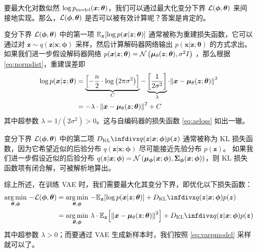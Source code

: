 要最大化对数似然 $\log p_{\mathrm {model}}(\bm x; \bm\theta)$，我们可以通过最大化变分下界 $\mathcal{L}(\bm \phi, \bm \theta)$ 来间接地实现。那么，$\mathcal{L}(\bm \phi, \bm \theta)$ 是否可以被有效计算呢？答案是肯定的。

变分下界 $\mathcal{L}(\bm \phi, \bm \theta)$ 中的第一项 $\mathbb{E}_{\bm z} {\left[\log p(\bm x | \bm z; \bm\theta)\right]}$ 通常被称为重建损失函数，它可以通过对 $\bm z \sim q(\bm z | \bm x; \bm\phi)$ 采样，然后计算解码器网络输出 $p(\bm x | \bm z; \bm\theta)$ 的方式求出。如果我们进一步假设解码器网络 $p(\bm x | \bm z; \bm\theta) = \mathcal{N}\left(\bm \mu_\theta(\bm z; \bm \theta), \sigma^2 I\right)$ %
，那么根据 \eqref{eq:normdist}，重建误差即
\begin{align}
	{%
		{%
				\log p(\bm x | \bm z; \bm\theta)%
			}}
	 & =
	\underbrace{\left[ - \frac{n}{2} \cdot \log\left(2\pi\sigma^2\right) \right]}_{C}
	-
	\underbrace{\left[ \frac{1}{2\sigma^2} \right]}_{\lambda} \cdot \Norm*{\bm x - \bm \mu_\theta(\bm z; \bm \theta)}^2 \notag \\
	 & = - \lambda \cdot\Norm*{\bm x - \bm \mu_\theta(\bm z; \bm \theta)}^2 + C
	\label{eq:vaerecons}
\end{align}
其中超参数 $\lambda = 1/\left(2\sigma^2\right)> 0$。这与自编码器的损失函数 \eqref{eq:aeloss} 如出一辙。

变分下界 $\mathcal{L}(\bm \phi, \bm \theta)$ 中的第二项 $\DKL{q(\bm z | \bm x; \bm\phi)}{p(\bm z)}$ 通常被称为 KL 损失函数，因为它希望近似的后验分布 $q(\bm z | \bm x; \bm\phi)$ 尽可能接近先验分布 $p(\bm z)$。
如果我们进一步假设近似的后验分布
$q(\bm z | \bm x; \bm\phi) = \mathcal{N}
	\left(
	\bm\mu_{\bm\phi}   (\bm x; \bm\phi),
	\bm\Sigma_{\bm\phi}(\bm x; \bm\phi)
	\right)$，则 KL 损失函数项有闭合解，可被解析地算出。

综上所述，在训练 VAE 时，我们需要最大化其变分下界，即优化以下损失函数：
\begin{align}
	\argmin{\bm\theta, \bm\phi}
	- \Loss(\bm \phi, \bm \theta) & =
	\argmin{\bm\theta, \bm\phi}
	- {\EXPECT{\bm z} {\left[\log p(\bm x | \bm z; \bm\theta)\right]}}
	+ \DKL{q(\bm z | \bm x; \bm\phi)}{p(\bm z)}
	\notag                                                                      \\
	                              & = \argmin{\bm\theta, \bm\phi} \lambda \cdot %
	{\EXPECT{\bm z}{\left[\Norm*{\bm x - \bm \mu_\theta(\bm z; \bm \theta)}^2\right]}}
	+ \DKL{q(\bm z | \bm x; \bm\phi)}{p(\bm z)}
\end{align}
其中超参数 $\lambda > 0$；而要通过 VAE 生成新样本时，我们按照 \eqref{eq:vaepmodel} 采样就可以了。

